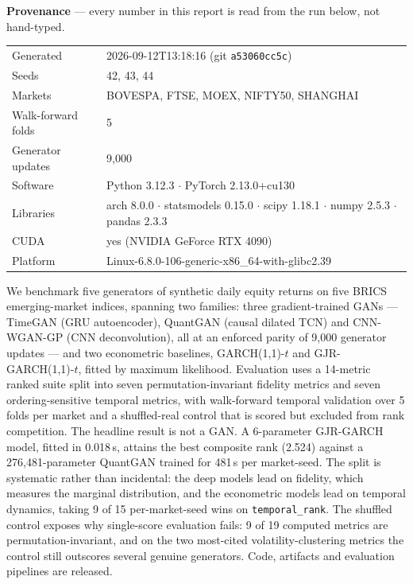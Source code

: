 \documentclass[10pt]{article}
\begin{document}
\begin{tcolorbox}[enhanced,arc=3pt,boxrule=0.8pt,
  colframe=Navy,colback=LBg,left=8pt,right=8pt,top=5pt,bottom=5pt]
\small\textbf{Provenance} --- every number in this report is read from the run below, not hand-typed.
\begin{tabular}{@{}ll@{}}
Generated & 2026-09-12T13:18:16 (git \texttt{a53060cc5c}) \\
Seeds & 42, 43, 44 \\
Markets & BOVESPA, FTSE, MOEX, NIFTY50, SHANGHAI \\
Walk-forward folds & 5 \\
Generator updates & 9,000 \\
Software & Python 3.12.3 $\cdot$ PyTorch 2.13.0+cu130 \\
Libraries & arch 8.0.0 $\cdot$ statsmodels 0.15.0 $\cdot$ scipy 1.18.1 $\cdot$ numpy 2.5.3 $\cdot$ pandas 2.3.3 \\
CUDA & yes (NVIDIA GeForce RTX 4090) \\
Platform & Linux-6.8.0-106-generic-x86\_64-with-glibc2.39\\
\end{tabular}
\end{tcolorbox}

\begin{tcolorbox}[enhanced,arc=4pt,boxrule=1pt,colframe=Navy,colback=LBg,
  top=6pt,bottom=6pt,left=8pt,right=8pt,before skip=2pt,after skip=8pt,
  title={\bfseries Abstract}]
\small
We benchmark five generators of synthetic daily equity returns on five BRICS emerging-market indices, spanning two families: three gradient-trained GANs --- TimeGAN (GRU autoencoder), QuantGAN (causal dilated TCN) and CNN-WGAN-GP (CNN deconvolution), all at an enforced parity of 9,000 generator updates --- and two econometric baselines, GARCH(1,1)-$t$ and GJR-GARCH(1,1)-$t$, fitted by maximum likelihood. Evaluation uses a 14-metric ranked suite split into seven permutation-invariant fidelity metrics and seven ordering-sensitive temporal metrics, with walk-forward temporal validation over 5 folds per market and a shuffled-real control that is scored but excluded from rank competition. The headline result is not a GAN. A 6-parameter GJR-GARCH model, fitted in 0.018\,s, attains the best composite rank (2.524) against a 276,481-parameter QuantGAN trained for 481\,s per market-seed. The split is systematic rather than incidental: the deep models lead on fidelity, which measures the marginal distribution, and the econometric models lead on temporal dynamics, taking 9 of 15 per-market-seed wins on \texttt{temporal\_rank}. The shuffled control exposes why single-score evaluation fails: 9 of 19 computed metrics are permutation-invariant, and on the two most-cited volatility-clustering metrics the control still outscores several genuine generators. Code, artifacts and evaluation pipelines are released.
\end{tcolorbox}
\end{document}

